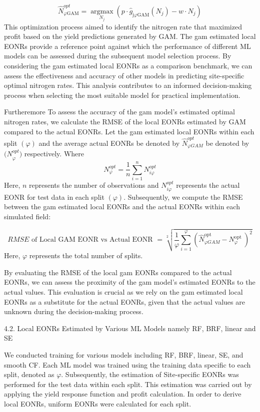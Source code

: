 \documentclass[
  12pt,
]{article}
\begin{document}
\[
\widehat{N}_{\varphi\mathrm{GAM}}^{o p t}=\underset{N_j}{\operatorname{argmax}}\left(p \cdot \hat{g}_{\mathrm{j} \varphi \mathrm{GAM}}\left(N_j\right)-w \cdot N_j\right)
\]
This optimization process aimed to identify the nitrogen rate that maximized profit based on the yield predictions generated by GAM.
The gam estimated local EONRs provide a reference point against which the performance of different ML models can be assessed during the subsequent model selection process. By considering the gam estimated local EONRs as a comparison benchmark, we can assess the effectiveness and accuracy of other models in predicting site-specific optimal nitrogen rates. This analysis contributes to an informed decision-making process when selecting the most suitable model for practical implementation.

Furtheremore To assess the accuracy of the gam model's estimated optimal nitrogen rates, we calculate the RMSE of the local EONRs estimated by GAM compared to the actual EONRs. Let the gam estimated local EONRs within each split \((\varphi)\) and the average actual EONRs be denoted by \({\hat{N}}_{\varphi GAM}^{opt}\) be denoted by \({(N}_\varphi^{opt})\) respectively. Where
\[
N_{\varphi}^{o p t}=\frac{1}{n} \sum_{i=1}^n N_{i \varphi}^{o p t}
\]
Here, \(n\) represents the number of observations and \(N_{i \varphi}^{o p t}\) represents the actual EONR for test data in each split \((\varphi)\).
Subsequently, we compute the RMSE between the gam estimated local EONRs and the actual EONRs within each simulated field:

\[
R M S E \text { of Local GAM EONR vs Actual EONR }=\sqrt[2]{\frac{1}{\varphi} \sum_{i=1}^{\varphi}\left(\widehat{N}_{\varphi G A M}^{\text {opt }}-N_{\varphi}^{\text {opt }}\right)^2}
\]
Here, \(\varphi\) represents the total number of splits.

By evaluating the RMSE of the local gam EONRs compared to the actual EONRs, we can assess the proximity of the gam model's estimated EONRs to the actual values. This evaluation is crucial as we rely on the gam estimated local EONRs as a substitute for the actual EONRs, given that the actual values are unknown during the decision-making process.

4.2. Local EONRs Estimated by Various ML Models namely RF, BRF, linear and SE

We conducted training for various models including RF, BRF, linear, SE, and smooth CF. Each ML model was trained using the training data specific to each split, denoted as \(\varphi\). Subsequently, the estimation of Site-specific EONRs was performed for the test data within each split. This estimation was carried out by applying the yield response function and profit calculation. In order to derive local EONRs, uniform EONRs were calculated for each split.
\end{document}
